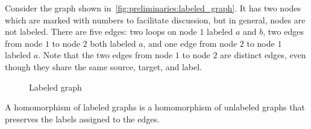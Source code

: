 \begin{example}
    Consider the graph shown in~\autoref{fig:preliminaries:labeled_graph}.
    It has two nodes which are marked with numbers to facilitate discussion, but in general, nodes are not labeled.
    There are five edges: two loops on node $1$ labeled \(a\) and \(b\), two edges from node $1$ to node $2$ both labeled \(a\), and one edge from node $2$ to node $1$ labeled \(a\). Note that the two edges from node $1$ to node $2$ are distinct edges, even though they share the same source, target, and label.

    \begin{figure}[H]
       \centering
        \caption{Labeled graph}
        \label{fig:preliminaries:labeled_graph}
    \end{figure}

\end{example}
  A homomorphism of labeled graphs is a homomorphism of unlabeled graphs that preserves the labels assigned to the edges. 